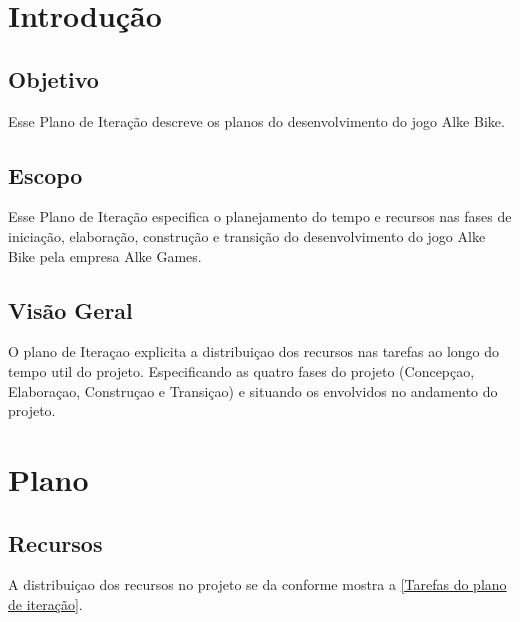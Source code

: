 \section{Introdução} 
\subsection{Objetivo}

Esse Plano de Iteração descreve os planos do desenvolvimento do jogo Alke Bike.

\subsection{Escopo}

Esse Plano de Iteração especifica o planejamento do tempo e recursos nas fases de iniciação, elaboração, construção e transição do desenvolvimento do jogo Alke Bike pela empresa Alke Games.

\subsection{Visão Geral}

O plano de Iteraçao explicita a distribuiçao dos recursos nas tarefas ao longo do tempo util do projeto. Especificando as quatro fases do projeto (Concepçao, Elaboraçao, Construçao e Transiçao) e situando os envolvidos no andamento do projeto.

\section{Plano}

\subsection{Recursos}

	A distribuiçao dos recursos no projeto se da conforme mostra a \ref{Tarefas do plano de iteração}.

